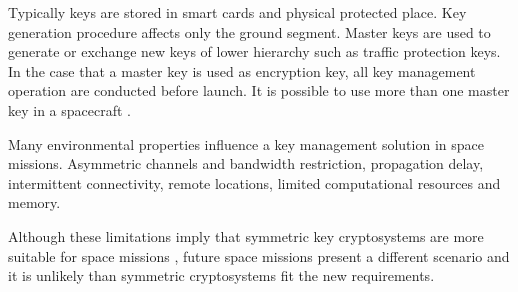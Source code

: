 Typically keys are stored in smart cards and physical protected place. Key generation procedure affects only the ground segment. Master keys are used to generate or exchange new keys of lower hierarchy such as traffic protection keys. In the case that a master key is used as encryption key, all key management operation are conducted before launch. It is possible to use more than one master key in a spacecraft \cite{book2011space}.

Many environmental properties influence a key management solution in space missions. Asymmetric channels and bandwidth restriction, propagation delay, intermittent connectivity, remote locations, limited computational resources and memory. 

Although these limitations imply that symmetric key cryptosystems are more suitable for space missions \cite{book2011space}, future space missions present a different scenario and it is unlikely than symmetric cryptosystems fit the new requirements.


